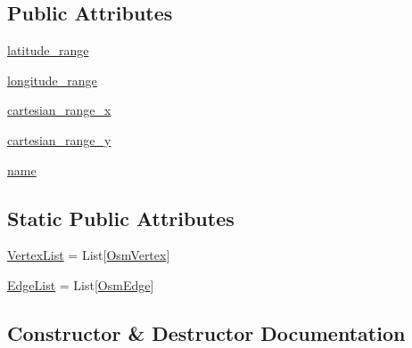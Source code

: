 \subsection*{Public Attributes}
\begin{DoxyCompactItemize}
\item 
\hyperlink{classbridges_1_1data__src__dependent_1_1osm_1_1_osm_data_a88caf10c4151c04822cb66af364fd45d}{latitude\+\_\+range}
\item 
\hyperlink{classbridges_1_1data__src__dependent_1_1osm_1_1_osm_data_a7745c671626fb8e97532ff8a9097a780}{longitude\+\_\+range}
\item 
\hyperlink{classbridges_1_1data__src__dependent_1_1osm_1_1_osm_data_a81e77104409461472dcaa68e68eb23da}{cartesian\+\_\+range\+\_\+x}
\item 
\hyperlink{classbridges_1_1data__src__dependent_1_1osm_1_1_osm_data_a5eb0046aadd6da88ca4cac617b054eb3}{cartesian\+\_\+range\+\_\+y}
\item 
\hyperlink{classbridges_1_1data__src__dependent_1_1osm_1_1_osm_data_adb5034420cd207bec97d80fab5e5be3a}{name}
\end{DoxyCompactItemize}
\subsection*{Static Public Attributes}
\begin{DoxyCompactItemize}
\item 
\hyperlink{classbridges_1_1data__src__dependent_1_1osm_1_1_osm_data_aa2bc633ab0d64a560165a1d55cc1f3a4}{Vertex\+List} = List\mbox{[}\hyperlink{classbridges_1_1data__src__dependent_1_1osm_1_1_osm_vertex}{Osm\+Vertex}\mbox{]}
\item 
\hyperlink{classbridges_1_1data__src__dependent_1_1osm_1_1_osm_data_a18b0ef38dba7bedcddd29d38d71d91d2}{Edge\+List} = List\mbox{[}\hyperlink{classbridges_1_1data__src__dependent_1_1osm_1_1_osm_edge}{Osm\+Edge}\mbox{]}
\end{DoxyCompactItemize}


\subsection{Constructor \& Destructor Documentation}
\mbox{\label{classbridges_1_1data__src__dependent_1_1osm_1_1_osm_data_ab36ec2f4933157aed6c28a02b258afee}} 
